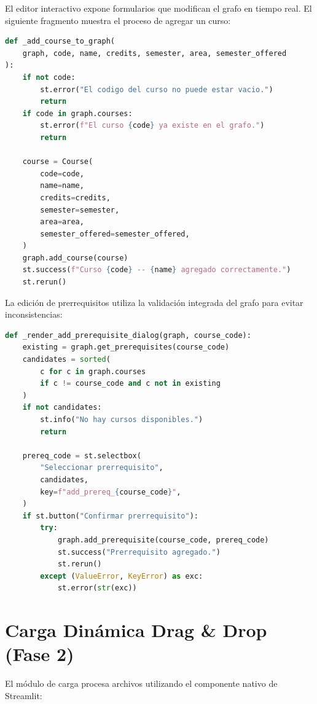 \documentclass[12pt]{report}
\begin{document}
El editor interactivo expone formularios que modifican el grafo en tiempo real. El siguiente fragmento muestra el proceso de agregar un curso:

\begin{lstlisting}[caption=Agregar curso desde el editor interactivo, label=lst:add-course-editor, language=Python]
def _add_course_to_graph(
    graph, code, name, credits, semester, area, semester_offered
):
    if not code:
        st.error("El codigo del curso no puede estar vacio.")
        return
    if code in graph.courses:
        st.error(f"El curso {code} ya existe en el grafo.")
        return

    course = Course(
        code=code,
        name=name,
        credits=credits,
        semester=semester,
        area=area,
        semester_offered=semester_offered,
    )
    graph.add_course(course)
    st.success(f"Curso {code} -- {name} agregado correctamente.")
    st.rerun()
\end{lstlisting}

La edición de prerrequisitos utiliza la validación integrada del grafo para evitar inconsistencias:

\begin{lstlisting}[caption=Agregar prerrequisito desde la interfaz, label=lst:add-prereq, language=Python]
def _render_add_prerequisite_dialog(graph, course_code):
    existing = graph.get_prerequisites(course_code)
    candidates = sorted(
        c for c in graph.courses
        if c != course_code and c not in existing
    )
    if not candidates:
        st.info("No hay cursos disponibles.")
        return

    prereq_code = st.selectbox(
        "Seleccionar prerrequisito",
        candidates,
        key=f"add_prereq_{course_code}",
    )
    if st.button("Confirmar prerrequisito"):
        try:
            graph.add_prerequisite(course_code, prereq_code)
            st.success("Prerrequisito agregado.")
            st.rerun()
        except (ValueError, KeyError) as exc:
            st.error(str(exc))
\end{lstlisting}

\section{Carga Dinámica Drag \& Drop (Fase 2)}

El módulo de carga procesa archivos utilizando el componente nativo de Streamlit:
\end{document}
